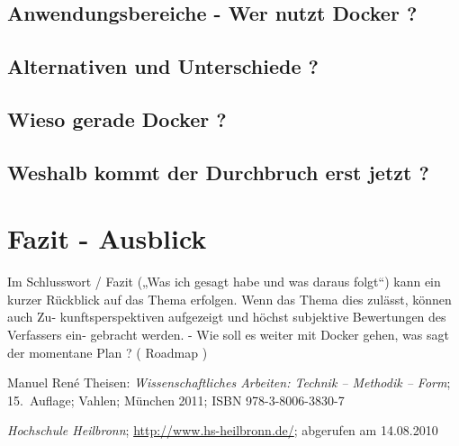 \documentclass[12pt,toc=bib,toc=listof]{scrreprt}
\begin{document}
\section{Anwendungsbereiche - Wer nutzt Docker ?}

\section{Alternativen und Unterschiede ?}

\section{Wieso gerade Docker ?}

\section{Weshalb kommt der Durchbruch erst jetzt ?}

\chapter{Fazit - Ausblick} %
\label{sec:fazit}
Im Schlusswort / Fazit („Was ich gesagt habe und was daraus folgt“) kann ein kurzer
Rückblick auf das Thema erfolgen. Wenn das Thema dies zulässt, können auch Zu-
kunftsperspektiven aufgezeigt und höchst subjektive Bewertungen des Verfassers ein-
gebracht werden.
- Wie soll es weiter mit Docker gehen, was sagt der momentane Plan ? ( Roadmap )


\appendix
\begin{thebibliography}{99}
\raggedright
 Manuel René Theisen:
 \emph{Wissenschaftliches Arbeiten: Technik -- Methodik -- Form};
 15.~Auflage; Vahlen; München 2011;
 ISBN 978-3-8006-3830-7

 \emph{Hochschule Heilbronn};
 \url{http://www.hs-heilbronn.de/};
 abgerufen am 14.08.2010
\end{thebibliography}
\end{document}
